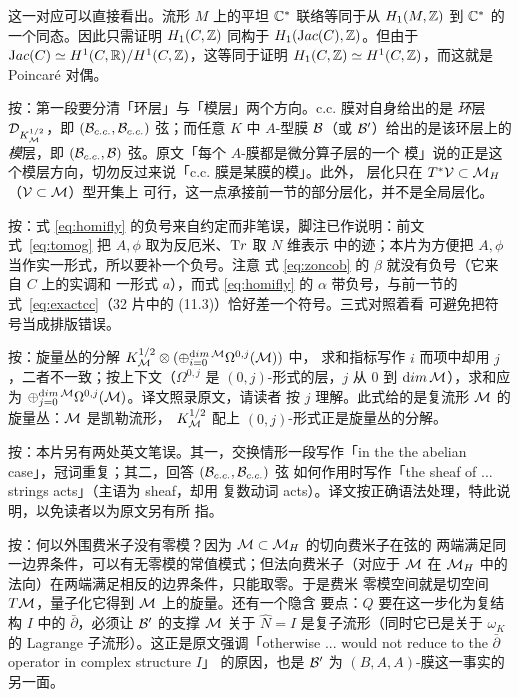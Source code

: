 这一对应可以直接看出。流形 $M$ 上的平坦 $\CC^*$ 联络等同于从
$H_1(M,\Bbb{Z})$ 到 $\CC^*$ 的一个同态。因此只需证明
$H_1(C,\Bbb{Z})$ 同构于 $H_1({\rm Jac}(C),\Bbb{Z})$。但由于
${\rm Jac}(C)\simeq H^1(C,\RR)/H^1(C,\Bbb{Z})$，这等同于证明
$H_1(C,\Bbb{Z})\simeq H^1(C,\Bbb{Z})$，而这就是 Poincaré 对偶。

\begin{yizhu}[易错点]
按：第一段要分清「环层」与「模层」两个方向。c.c. 膜对自身给出的是
\emph{环}层 ${\cal D}_{K_\M^{1/2}}$，即 $({\cal B}_{c.c.},
{\cal B}_{c.c.})$ 弦；而任意 $K$ 中 $A$-型膜 ${\cal B}$（或
${\cal B}'$）给出的是该环层上的\emph{模}层，即
$({\cal B}_{c.c.},{\cal B})$ 弦。原文「每个 $A$-膜都是微分算子层的一个
模」说的正是这个模层方向，切勿反过来说「c.c. 膜是某膜的模」。此外，
层化只在 $T^*{{\cal V}}\subset\MH$（${{\cal V}}\subset\M$）型开集上
可行，这一点承接前一节的部分层化，并不是全局层化。
\end{yizhu}

\begin{yizhu}[易错点]
按：式 \eqref{eq:homifly} 的负号来自约定而非笔误，脚注已作说明：前文
式~\eqref{eq:tomog} 把 $A,\phi$ 取为反厄米、${\rm Tr}$ 取 $N$ 维表示
中的迹；本片为方便把 $A,\phi$ 当作实一形式，所以要补一个负号。注意
式 \eqref{eq:zoncob} 的 $\beta$ 就没有负号（它来自 $C$ 上的实调和
一形式 $a$），而式 \eqref{eq:homifly} 的 $\alpha$ 带负号，与前一节的
式~\eqref{eq:exactcc}（32 片中的 (11.3)）恰好差一个符号。三式对照着看
可避免把符号当成排版错误。
\end{yizhu}

\begin{yizhu}[原文疑误]
按：旋量丛的分解
$K_\M^{1/2}\otimes(\oplus_{i=0}^{{\rm dim}\,\M}\Omega^{0,j}(\M))$ 中，
求和指标写作 $i$ 而项中却用 $j$，二者不一致；按上下文（$\Omega^{0,j}$
是 $(0,j)$-形式的层，$j$ 从 $0$ 到 ${\rm dim}\,\M$），求和应为
$\oplus_{j=0}^{{\rm dim}\,\M}\Omega^{0,j}(\M)$。译文照录原文，请读者
按 $j$ 理解。此式给的是复流形 $\M$ 的旋量丛：$\M$ 是凯勒流形，
$K_\M^{1/2}$ 配上 $(0,j)$-形式正是旋量丛的分解。
\end{yizhu}

\begin{yizhu}[原文疑误]
按：本片另有两处英文笔误。其一，交换情形一段写作「in the the abelian
case」，冠词重复；其二，回答 $({\cal B}_{c.c.},{\cal B}_{c.c.})$ 弦
如何作用时写作「the sheaf of ... strings acts」（主语为 sheaf，却用
复数动词 acts）。译文按正确语法处理，特此说明，以免读者以为原文另有所
指。
\end{yizhu}

\begin{yizhu}[含糊点拨]
按：何以外围费米子没有零模？因为 $\M\subset\MH$ 的切向费米子在弦的
两端满足同一边界条件，可以有无零模的常值模式；但法向费米子（对应于
$\M$ 在 $\MH$ 中的法向）在两端满足相反的边界条件，只能取零。于是费米
零模空间就是切空间 $T\M$，量子化它得到 $\M$ 上的旋量。还有一个隐含
要点：$Q$ 要在这一步化为复结构 $I$ 中的 $\bar\partial$，必须让 ${\cal
B}'$ 的支撑 $\M$ 关于 $\hat N=I$ 是复子流形（同时它已是关于
$\omega_K$ 的 Lagrange 子流形）。这正是原文强调「otherwise ... would
not reduce to the $\bar\partial$ operator in complex structure $I$」
的原因，也是 ${\cal B}'$ 为 $(B,A,A)$-膜这一事实的另一面。
\end{yizhu}

